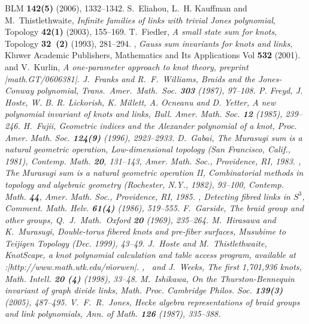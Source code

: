 {\begin{thebibliography}{BLM}
	{\bf 142(5)} (2006), 1332--1342.
 S.\ Eliahou, L.\ H. Kauffman and M.\ Thistlethwaite,
	{\em Infinite families of links with trivial Jones polynomial},
	Topology {\bf 42(1)} (2003), 155--169.
 T.~Fiedler, {\em A small state sum for knots},
	Topology {\bf 32~(2)} (1993), 281--294.
 \bysame, {\em Gauss sum invariants for knots
	and links}, Kluwer Academic Publishers, Mathematics and Its
	Applications Vol {\bf 532} (2001).
 \bysame\, and V.\ Kurlin, \em{A one-parameter
	approach to knot theory}, preprint \web|math.GT/0606381|.
 J.\ Franks and R.\ F.\ Williams, \em{Braids and the
	Jones-Conway polynomial}, Trans.\ Amer.\ Math.\ Soc. {\bf 303}
	(1987), 97--108.
 P. Freyd, J. Hoste, W. B. R. Lickorish,
	K. Millett, A. Ocneanu and D. Yetter, {\it A new polynomial
	invariant of knots and links}, Bull. Amer. Math. Soc.
	{\bf 12} (1985), 239--246.
 H.~Fujii, \em{Geometric indices and the Alexander
	polynomial of a knot},
	Proc. Amer. Math. Soc. {\bf 124(9)} (1996), 2923--2933.
 D.~Gabai, \em{The Murasugi sum is a natural
	geometric operation}, Low-dimensional topology (San Francisco,
	Calif., 1981), Contemp. Math. {\bf 20}, 131--143, Amer. Math.
	Soc., Providence, RI, 1983.
 \bysame, \em{The Murasugi sum is a natural
	geometric operation II}, Combinatorial methods in
	topology and algebraic geometry (Rochester, N.Y., 1982),
	93--100, Contemp. Math. {\bf 44}, Amer. Math. Soc.,
	Providence, RI, 1985.
 \bysame, \em{Detecting fibred links in $S^3$},
 	Comment. Math. Helv.  {\bf 61(4)} (1986), 519--555.
 F.~Garside, \em{The braid group and other groups},
	Q.~J.~Math.~Oxford {\bf 20} (1969), 235--264.
 M.~Hirasawa and K.~Murasugi, \em{Double-torus
	fibered knots and pre-fiber surfaces}, Musubime to Teijigen
	Topology (Dec. 1999), 43--49.
 J.~Hoste and M.~Thistlethwaite, {\em
	KnotScape}, a knot polynomial calculation and table access
	program, available at \webb:|http://www.math.utk.edu/\~morwen|.
 \bysame, \bysame\, and J.~Weeks, \em{The first
	1,701,936 knots}, Math. Intell. {\bf 20 (4)} (1998), 33--48.
 M.~Ishikawa, {\em On the Thurston-Bennequin
	invariant of graph divide links}, Math. Proc. Cambridge
	Philos. Soc. {\bf 139(3)} (2005), 487--495.
 V.~F.~R.~Jones, {\em Hecke algebra representations 
	of braid groups and link polynomials}, Ann. of Math.
	{\bf 126} (1987), 335--388.

\end{thebibliography}}
